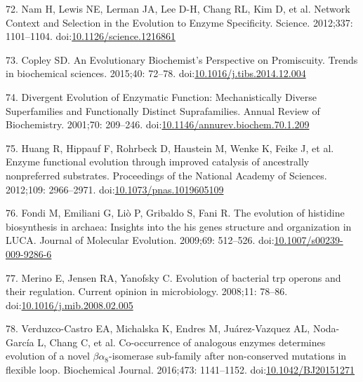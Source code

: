 \documentclass[12pt,twoside]{reedthesis}
\begin{document}
  \hypertarget{ref-namux5fnetworkux5f2012}{}
  72. Nam H, Lewis NE, Lerman JA, Lee D-H, Chang RL, Kim D, et al. Network
  Context and Selection in the Evolution to Enzyme Specificity. Science.
  2012;337: 1101--1104.
  doi:\href{https://doi.org/10.1126/science.1216861}{10.1126/science.1216861}
  
  \hypertarget{ref-copleyux5fevolutionaryux5f2015}{}
  73. Copley SD. An Evolutionary Biochemist's Perspective on Promiscuity.
  Trends in biochemical sciences. 2015;40: 72--78.
  doi:\href{https://doi.org/10.1016/j.tibs.2014.12.004}{10.1016/j.tibs.2014.12.004}
  
  \hypertarget{ref-gerltux5fdivergentux5f2001}{}
  74. Divergent Evolution of Enzymatic Function: Mechanistically Diverse
  Superfamilies and Functionally Distinct Suprafamilies. Annual Review of
  Biochemistry. 2001;70: 209--246.
  doi:\href{https://doi.org/10.1146/annurev.biochem.70.1.209}{10.1146/annurev.biochem.70.1.209}
  
  \hypertarget{ref-huangux5fenzymeux5f2012}{}
  75. Huang R, Hippauf F, Rohrbeck D, Haustein M, Wenke K, Feike J, et al.
  Enzyme functional evolution through improved catalysis of ancestrally
  nonpreferred substrates. Proceedings of the National Academy of
  Sciences. 2012;109: 2966--2971.
  doi:\href{https://doi.org/10.1073/pnas.1019605109}{10.1073/pnas.1019605109}
  
  \hypertarget{ref-fondiux5fevolutionux5f2009}{}
  76. Fondi M, Emiliani G, Liò P, Gribaldo S, Fani R. The evolution of
  histidine biosynthesis in archaea: Insights into the his genes structure
  and organization in LUCA. Journal of Molecular Evolution. 2009;69:
  512--526.
  doi:\href{https://doi.org/10.1007/s00239-009-9286-6}{10.1007/s00239-009-9286-6}
  
  \hypertarget{ref-merinoux5fevolutionux5f2008}{}
  77. Merino E, Jensen RA, Yanofsky C. Evolution of bacterial trp operons
  and their regulation. Current opinion in microbiology. 2008;11: 78--86.
  doi:\href{https://doi.org/10.1016/j.mib.2008.02.005}{10.1016/j.mib.2008.02.005}
  
  \hypertarget{ref-verduzco-castroux5fco-occurrenceux5f2016}{}
  78. Verduzco-Castro EA, Michalska K, Endres M, Juárez-Vazquez AL,
  Noda-García L, Chang C, et al. Co-occurrence of analogous enzymes
  determines evolution of a novel \(\beta\alpha_8\)-isomerase sub-family
  after non-conserved mutations in flexible loop. Biochemical Journal.
  2016;473: 1141--1152.
  doi:\href{https://doi.org/10.1042/BJ20151271}{10.1042/BJ20151271}
  
\end{document}
